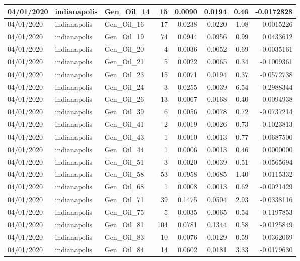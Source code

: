 \documentclass[
  letterpaper,
  DIV=11,
  numbers=noendperiod]{scrartcl}
\begin{document}
\begin{tabular}{l|l|l|r|r|r|r|r}
\hline
04/01/2020 & indianapolis & Gen\_Oil\_14 & 15 & 0.0090 & 0.0194 & 0.46 & -0.0172828\\
\hline
04/01/2020 & indianapolis & Gen\_Oil\_16 & 17 & 0.0238 & 0.0220 & 1.08 & 0.0015226\\
\hline
04/01/2020 & indianapolis & Gen\_Oil\_19 & 74 & 0.0944 & 0.0956 & 0.99 & 0.0433612\\
\hline
04/01/2020 & indianapolis & Gen\_Oil\_20 & 4 & 0.0036 & 0.0052 & 0.69 & -0.0035161\\
\hline
04/01/2020 & indianapolis & Gen\_Oil\_21 & 5 & 0.0022 & 0.0065 & 0.34 & -0.1009361\\
\hline
04/01/2020 & indianapolis & Gen\_Oil\_23 & 15 & 0.0071 & 0.0194 & 0.37 & -0.0572738\\
\hline
04/01/2020 & indianapolis & Gen\_Oil\_24 & 3 & 0.0255 & 0.0039 & 6.54 & -0.2988344\\
\hline
04/01/2020 & indianapolis & Gen\_Oil\_26 & 13 & 0.0067 & 0.0168 & 0.40 & 0.0094938\\
\hline
04/01/2020 & indianapolis & Gen\_Oil\_39 & 6 & 0.0056 & 0.0078 & 0.72 & -0.0737214\\
\hline
04/01/2020 & indianapolis & Gen\_Oil\_41 & 2 & 0.0019 & 0.0026 & 0.73 & -0.1023813\\
\hline
04/01/2020 & indianapolis & Gen\_Oil\_43 & 1 & 0.0010 & 0.0013 & 0.77 & -0.0687500\\
\hline
04/01/2020 & indianapolis & Gen\_Oil\_44 & 1 & 0.0006 & 0.0013 & 0.46 & 0.0000000\\
\hline
04/01/2020 & indianapolis & Gen\_Oil\_51 & 3 & 0.0020 & 0.0039 & 0.51 & -0.0565694\\
\hline
04/01/2020 & indianapolis & Gen\_Oil\_58 & 53 & 0.0958 & 0.0685 & 1.40 & 0.0115332\\
\hline
04/01/2020 & indianapolis & Gen\_Oil\_68 & 1 & 0.0008 & 0.0013 & 0.62 & -0.0021429\\
\hline
04/01/2020 & indianapolis & Gen\_Oil\_71 & 39 & 0.1475 & 0.0504 & 2.93 & -0.0338116\\
\hline
04/01/2020 & indianapolis & Gen\_Oil\_75 & 5 & 0.0035 & 0.0065 & 0.54 & -0.1197853\\
\hline
04/01/2020 & indianapolis & Gen\_Oil\_81 & 104 & 0.0781 & 0.1344 & 0.58 & -0.0125849\\
\hline
04/01/2020 & indianapolis & Gen\_Oil\_83 & 10 & 0.0076 & 0.0129 & 0.59 & 0.0362069\\
\hline
04/01/2020 & indianapolis & Gen\_Oil\_84 & 14 & 0.0602 & 0.0181 & 3.33 & -0.0179630\\

\end{tabular}
\end{document}
